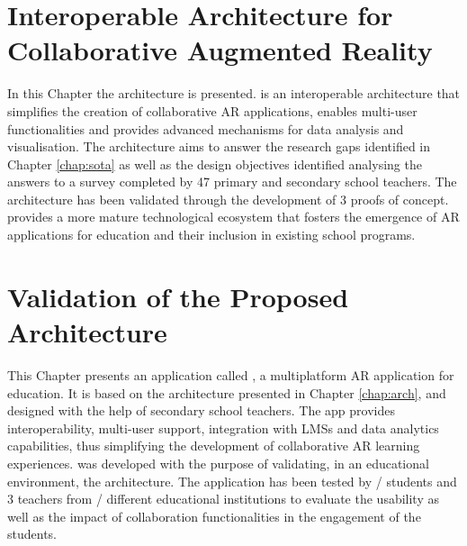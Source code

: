 




\graphicspath{{ResearchResults/figures/}{ResearchResults/figures/JPG/}{ResearchResults/figures/PDF/}{ResearchResults/figures/}{ResearchResults/figures/EPS/}}

\chapter{Interoperable Architecture for Collaborative Augmented Reality}
\label{chap:arch}

In this Chapter the \arch{} architecture is presented. \arch{} is an interoperable architecture that simplifies the creation of collaborative AR applications, enables multi-user functionalities and provides advanced mechanisms for data analysis and visualisation. The architecture aims to answer the research gaps identified in Chapter \ref{chap:sota} as well as the design objectives identified analysing the answers to a survey completed by 47 primary and secondary school teachers. The architecture has been validated through the development of 3 proofs of concept. \arch{} provides a more mature technological ecosystem that fosters the emergence of AR applications for education and their inclusion in existing school programs.



\chapter{Validation of the Proposed Architecture}
\label{chap:eval}

This Chapter presents an application called \appname{}, a multiplatform AR application for education. It is based on the \arch{} architecture presented in Chapter \ref{chap:arch}, and designed with the help of secondary school teachers. The app provides interoperability, multi-user support, integration with LMSs and data analytics capabilities, thus simplifying the development of collaborative AR learning experiences. \appname{} was developed with the purpose of validating, in an educational environment, the \arch{} architecture.
The application has been tested by \numstudents/ students and 3 teachers from \numschools/ different educational institutions to evaluate the usability as well as the impact of collaboration functionalities in the engagement of the students.


